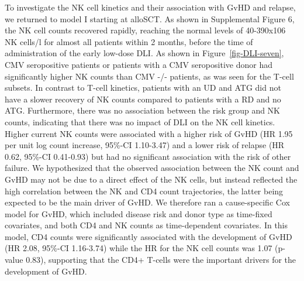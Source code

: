 \documentclass[
  letterpaper,
  paper=240mm:170mm,
  twoside=true,
  open=right,
  fontsize=10pt,
  pagesize=false,
  BCOR=15mm,
  DIV=14,
  headinclude=true,
  footinclude=false,
  headsepline=on]{scrbook}
\begin{document}
To investigate the NK cell kinetics and their association with GvHD and
relapse, we returned to model I starting at alloSCT. As shown in
Supplemental Figure 6, the NK cell counts recovered rapidly, reaching
the normal levels of 40-390x106 NK cells/l for almost all patients
within 2 months, before the time of administration of the early low-dose
DLI. As shown in Figure~\ref{fig-DLI-seven}, CMV seropositive patients
or patients with a CMV seropositive donor had significantly higher NK
counts than CMV -/- patients, as was seen for the T-cell subsets. In
contrast to T-cell kinetics, patients with an UD and ATG did not have a
slower recovery of NK counts compared to patients with a RD and no ATG.
Furthermore, there was no association between the risk group and NK
counts, indicating that there was no impact of DLI on the NK cell
kinetics. Higher current NK counts were associated with a higher risk of
GvHD (HR 1.95 per unit log count increase, 95\%-CI 1.10-3.47) and a
lower risk of relapse (HR 0.62, 95\%-CI 0.41-0.93) but had no
significant association with the risk of other failure. We hypothesized
that the observed association between the NK count and GvHD may not be
due to a direct effect of the NK cells, but instead reflected the high
correlation between the NK and CD4 count trajectories, the latter being
expected to be the main driver of GvHD. We therefore ran a
cause-specific Cox model for GvHD, which included disease risk and donor
type as time-fixed covariates, and both CD4 and NK counts as
time-dependent covariates. In this model, CD4 counts were significantly
associated with the development of GvHD (HR 2.08, 95\%-CI 1.16-3.74)
while the HR for the NK cell counts was 1.07 (p-value 0.83), supporting
that the CD4+ T-cells were the important drivers for the development of
GvHD.
\end{document}
